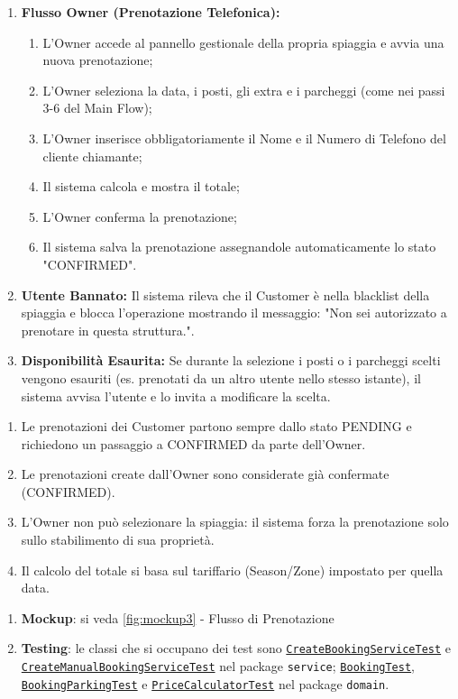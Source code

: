 {
	\begin{enumerate}[nosep, leftmargin=36px]
		\item[\textbf{1a.}] \textbf{Flusso Owner (Prenotazione Telefonica):}
		\begin{enumerate}[nosep, leftmargin=*]
			\item[i.] L'Owner accede al pannello gestionale della propria spiaggia e avvia una nuova prenotazione;
			\item[ii.] L'Owner seleziona la data, i posti, gli extra e i parcheggi (come nei passi 3-6 del Main Flow);
			\item[iii.] L'Owner inserisce obbligatoriamente il Nome e il Numero di Telefono del cliente chiamante;
			\item[iv.] Il sistema calcola e mostra il totale;
			\item[v.] L'Owner conferma la prenotazione;
			\item[vi.] Il sistema salva la prenotazione assegnandole automaticamente lo stato "CONFIRMED".
		\end{enumerate}
		\item[\textbf{2a-e.}] \textbf{Utente Bannato:} Il sistema rileva che il Customer è nella blacklist della spiaggia e blocca l'operazione mostrando il messaggio: "Non sei autorizzato a prenotare in questa struttura.".
		\item[\textbf{4/6a-e.}] \textbf{Disponibilità Esaurita:} Se durante la selezione i posti o i parcheggi scelti vengono esauriti (es. prenotati da un altro utente nello stesso istante), il sistema avvisa l'utente e lo invita a modificare la scelta.
	\end{enumerate}
}
{
	\begin{enumerate}[nosep, leftmargin=*]
		\item[•] Le prenotazioni dei Customer partono sempre dallo stato PENDING e richiedono un passaggio a CONFIRMED da parte dell'Owner.
		\item[•] Le prenotazioni create dall'Owner sono considerate già confermate (CONFIRMED). 
		\item[•] L'Owner non può selezionare la spiaggia: il sistema forza la prenotazione solo sullo stabilimento di sua proprietà.
		\item[•] Il calcolo del totale si basa sul tariffario (Season/Zone) impostato per quella data.
	\end{enumerate}
	
	\begin{enumerate}[leftmargin=*]
		\item[•] \textbf{Mockup}: si veda \autoref{fig:mockup3} - Flusso di Prenotazione
		
		\item[•] \textbf{Testing}: le classi che si occupano dei test sono \hyperref[itm:application_booking]{\texttt{CreateBookingServiceTest}} e \hyperref[itm:application_booking]{\texttt{CreateManualBookingServiceTest}} nel package \texttt{service}; \hyperref[itm:domain_booking_pricecalculator]{\texttt{BookingTest}}, \hyperref[itm:domain_booking_pricecalculator]{\texttt{BookingParkingTest}} e \hyperref[itm:domain_booking_pricecalculator]{\texttt{PriceCalculatorTest}} nel package \texttt{domain}.
	\end{enumerate}
}